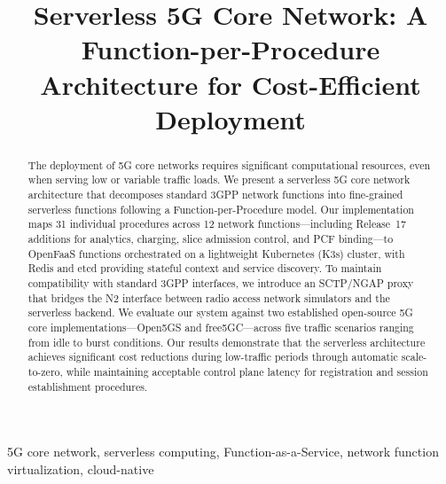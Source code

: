 \documentclass[conference]{IEEEtran}
\begin{document}
\title{Serverless 5G Core Network: A Function-per-Procedure Architecture for Cost-Efficient Deployment}

\author{
}

\maketitle

\begin{abstract}
The deployment of 5G core networks requires significant computational resources, even when serving low or variable traffic loads. We present a serverless 5G core network architecture that decomposes standard 3GPP network functions into fine-grained serverless functions following a Function-per-Procedure model. Our implementation maps 31 individual procedures across 12 network functions---including Release~17 additions for analytics, charging, slice admission control, and PCF binding---to OpenFaaS functions orchestrated on a lightweight Kubernetes (K3s) cluster, with Redis and etcd providing stateful context and service discovery. To maintain compatibility with standard 3GPP interfaces, we introduce an SCTP/NGAP proxy that bridges the N2 interface between radio access network simulators and the serverless backend. We evaluate our system against two established open-source 5G core implementations---Open5GS and free5GC---across five traffic scenarios ranging from idle to burst conditions. Our results demonstrate that the serverless architecture achieves significant cost reductions during low-traffic periods through automatic scale-to-zero, while maintaining acceptable control plane latency for registration and session establishment procedures.
\end{abstract}

\begin{IEEEkeywords}
5G core network, serverless computing, Function-as-a-Service, network function virtualization, cloud-native
\end{IEEEkeywords}







\end{document}
